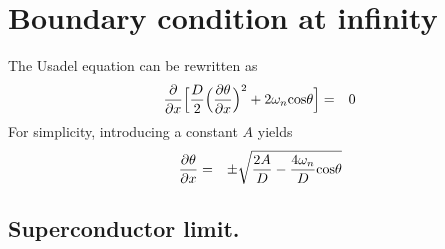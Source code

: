 \documentclass[uplatex,a4j,12pt,dvipdfmx]{jsarticle}
\begin{document}
\section{Boundary condition at infinity}

The Usadel equation can be rewritten as
\begin{eqnarray}
	\dfrac{\partial}{\partial x}
	\Big[
		\dfrac{D}{2}
		\Big( \dfrac{\partial \theta}{\partial x} \Big)^{2}
		+
		2 \omega_{n}
		{\rm cos} \theta
		\Big]
	&=&
	0
\end{eqnarray}
For simplicity, introducing a constant $A$ yields
\begin{eqnarray}
	\dfrac{\partial \theta}{\partial x}
	&=&
	\pm
	\sqrt{
		\dfrac{2A}{D}
		-
		\dfrac{4 \omega_{n}}{D}
		{\rm cos} \theta
	}
\end{eqnarray}
\subsection{Superconductor limit.}
\end{document}
